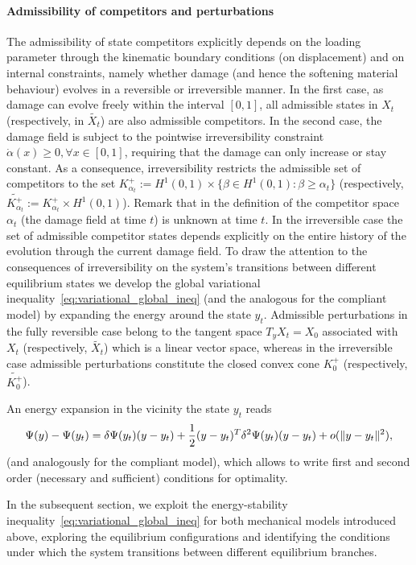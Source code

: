 \documentclass[10pt]{article}
\begin{document}
\paragraph{Admissibility of competitors and perturbations}
The admissibility of state competitors explicitly depends on the loading parameter through the kinematic boundary conditions (on displacement) and on internal constraints, namely whether damage (and hence the softening material behaviour)  evolves in a reversible or irreversible manner.
In the first case, as damage can evolve freely within the interval $[0, 1]$, all admissible states in $X_t$  (respectively, in $\widetilde{X_t}$) are also admissible competitors.
In the second case, the damage field is subject to the pointwise irreversibility constraint $\dot \alpha(x)\geq 0, \forall x\in [0, 1]$, requiring that the damage can only increase or stay constant.
As a consequence, irreversibility restricts the admissible set of competitors to the set $K^+_{\alpha_t}:=H^1(0, 1) \times \{\beta\in H^1(0, 1): \beta\geq \alpha_t\}$ (respectively, $\widetilde{K^+_{\alpha_t}}:=K^+_{\alpha_t}\times H^1(0, 1)$).
Remark that in the definition of the competitor space $\alpha_t$ (the damage field at time $t$) is unknown at time $t$.
In the irreversible case the set of admissible competitor states depends explicitly on the entire history of the evolution through the current damage field.
To draw the attention to the consequences of irreversibility on the system's transitions between different equilibrium states we develop the global variational inequality~\eqref{eq:variational_global_ineq} (and the analogous for the compliant model) by expanding the energy around the state $y_t$.
Admissible perturbations in the fully reversible case belong to the {tangent} space {$T_y X_t=X_0$} associated with  $X_t$ (respectively, $\widetilde{X_t}$) {which is a linear vector space}, whereas in the irreversible case {admissible perturbations constitute} the closed convex cone $K^+_0$ (respectively, $\widetilde{K^+_0}$).

An energy expansion in the vicinity the state $y_t$ reads
$$
    \Psi(y)-\Psi(y_t)= \delta\Psi(y_t)(y-y_t)+\frac{1}{2}(y-y_t)^T \delta^2\Psi(y_t)(y-y_t)+o(\|y-y_t\|^2),
    \label{eqn:energy-expansion}
$$
%
(and analogously for the compliant model), which allows to write first and second order (necessary and sufficient) conditions for optimality.


%

%

In the subsequent section, we exploit the energy-stability inequality~\eqref{eq:variational_global_ineq} for both mechanical models introduced above, exploring the equilibrium configurations and identifying the conditions under which the system transitions between different equilibrium branches.
\end{document}
